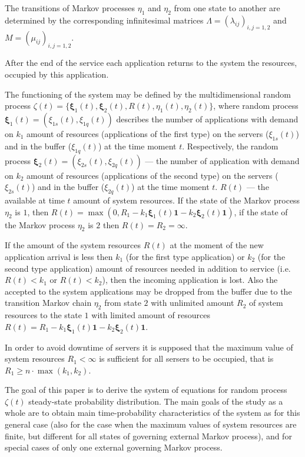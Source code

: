 \documentclass[default]{subfiles}
\begin{document}
{The transitions of Markov processes $\eta_1$ and $\eta_2$ from one
state to another are determined by the corresponding infinitesimal
matrices $\Lambda=\left(\lambda_{ij}\right)_{i,j=1,2}$ and
$M=\left(\mu_{ij}\right)_{i,j=1,2}$.

After the end of the service each application returns to the system
the resources, occupied by this application.

The functioning of the system may be defined by the multidimensional
random process
$\zeta(t)=\{\mathbf{\xi}_1 (t), \mathbf{\xi}_2 (t),R(t),\eta_1
(t),\eta_2 (t)\}$, where random process
$\mathbf{\xi}_1 (t)=\left(\xi_{1s}(t),\xi_{1q}(t)\right)$ describes
the number of applications with demand on $k_1$ amount of resources
(applications of the first type) on the servers ($\xi_{1s}(t)$) and in
the buffer ($\xi_{1q}(t)$) at the time moment $t$.  Respectively, the
random process
$\mathbf{\xi}_2 (t)=\left(\xi_{2s}(t),\xi_{2q}(t)\right)$ --- the
number of application with demand on $k_2$ amount of resources
(applications of the second type) on the servers ($\xi_{2s}(t)$) and
in the buffer ($\xi_{2q}(t)$) at the time moment $t$. $R(t)$ --- the
available at time $t$ amount of system resources. If the state of the
Markov process $\eta_2$ is $1$, then
$R(t)=\max(0, R_1 - k_1\mathbf{\xi}_1(t)\mathbf{1} - k_2
\mathbf{\xi}_2 (t)\mathbf{1})$, if the state of the Markov process
$\eta_2$ is $2$ then $R(t)=R_2=\infty$.

If the amount of the system resources $R(t)$ at the moment of the new
application arrival is less then $k_1$ (for the first type
application) or $k_2$ (for the second type application) amount of
resources needed in addition to service (i.e. $R(t)<k_1$ or
$R(t)<k_2$), then the incoming application is lost. Also the accepted
to the system applications may be dropped from the buffer due to the
transition Markov chain $\eta_2$ from state $2$ with unlimited amount
$R_2$ of system resources to the state $1$ with limited amount of
resources
$R(t)=R_1 - k_1\mathbf{\xi}_1(t)\mathbf{1} - k_2 \mathbf{\xi}_2
(t)\mathbf{1}$.

In order to avoid downtime of servers it is supposed that the maximum
value of system resources $R_1<\infty$ is sufficient for all sersers
to be occupied, that is $R_1\geqslant  n\cdot\max(k_1,k_2)$.


The goal of this paper is to derive the system of equations for random
process $\zeta(t)$ steady-state probability distribution. The main
goals of the study as a whole are to obtain main time-probability
characteristics of the system as for this general case (also for the
case when the maximum values of system resources are finite, but
different for all states of governing external Markov process), and
for special cases of only one external governing Markov process.


}
\end{document}
